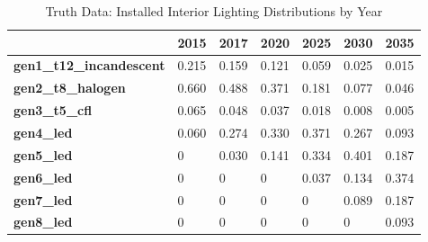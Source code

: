 \begin{table}
\small
\centering
\caption{Truth Data: Installed Interior Lighting Distributions by Year}
\label{tab:ltg_truth}
\begin{tabular}{|l|l|l|l|l|l|l|}
\hline
\textbf{}                        & \textbf{2015}  & \textbf{2017} & \textbf{2020} & \textbf{2025} & \textbf{2030} & \textbf{2035} \\ \hline
\textbf{gen1\_t12\_incandescent} & 0.215 & 0.159         & 0.121         & 0.059         & 0.025         & 0.015         \\ \hline
\textbf{gen2\_t8\_halogen}       & 0.660 & 0.488         & 0.371         & 0.181         & 0.077         & 0.046         \\ \hline
\textbf{gen3\_t5\_cfl}           & 0.065 & 0.048         & 0.037         & 0.018         & 0.008         & 0.005         \\ \hline
\textbf{gen4\_led}               & 0.060 & 0.274         & 0.330         & 0.371         & 0.267         & 0.093         \\ \hline
\textbf{gen5\_led}               & 0     & 0.030         & 0.141         & 0.334         & 0.401         & 0.187         \\ \hline
\textbf{gen6\_led}               & 0     & 0             & 0             & 0.037         & 0.134         & 0.374         \\ \hline
\textbf{gen7\_led}               & 0     & 0             & 0             & 0             & 0.089         & 0.187         \\ \hline
\textbf{gen8\_led}               & 0     & 0             & 0             & 0             & 0             & 0.093         \\ \hline
\end{tabular}
\end{table}